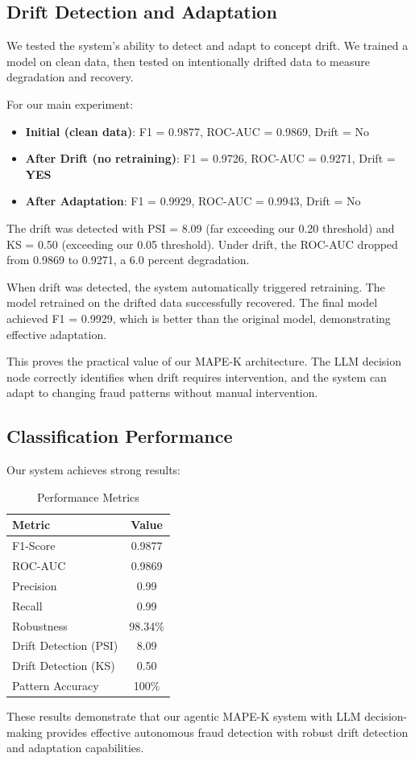 \subsection{Drift Detection and Adaptation}

We tested the system's ability to detect and adapt to concept drift. We trained a model on clean data, then tested on intentionally drifted data to measure degradation and recovery.

For our main experiment:
\begin{itemize}
  \item \textbf{Initial (clean data)}: F1 = 0.9877, ROC-AUC = 0.9869, Drift = No
  \item \textbf{After Drift (no retraining)}: F1 = 0.9726, ROC-AUC = 0.9271, Drift = \textbf{YES}
  \item \textbf{After Adaptation}: F1 = 0.9929, ROC-AUC = 0.9943, Drift = No
\end{itemize}

The drift was detected with PSI = 8.09 (far exceeding our 0.20 threshold) and KS = 0.50 (exceeding our 0.05 threshold). Under drift, the ROC-AUC dropped from 0.9869 to 0.9271, a 6.0 percent degradation.

When drift was detected, the system automatically triggered retraining. The model retrained on the drifted data successfully recovered. The final model achieved F1 = 0.9929, which is better than the original model, demonstrating effective adaptation.

This proves the practical value of our MAPE-K architecture. The LLM decision node correctly identifies when drift requires intervention, and the system can adapt to changing fraud patterns without manual intervention.

\subsection{Classification Performance}

Our system achieves strong results:

\begin{table}[h]
\centering
\caption{Performance Metrics}
\begin{tabular}{|l|c|}
\hline
Metric & Value \\
\hline
F1-Score & 0.9877 \\
ROC-AUC & 0.9869 \\
Precision & 0.99 \\
Recall & 0.99 \\
Robustness & 98.34\% \\
Drift Detection (PSI) & 8.09 \\
Drift Detection (KS) & 0.50 \\
Pattern Accuracy & 100\% \\
\hline
\end{tabular}
\end{table}

These results demonstrate that our agentic MAPE-K system with LLM decision-making provides effective autonomous fraud detection with robust drift detection and adaptation capabilities.